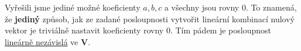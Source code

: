 \documentclass[12pt]{article}
\begin{document}
\begin{enumerate}
    Vyřešili jsme jediné možné koeficienty $a,b,c$ a všechny jsou rovny $0$. To znamená,
    že \textbf{jediný} způsob, jak ze zadané posloupnosti vytvořit lineární kombinací nulový vektor je triviálně nastavit koeficienty rovny $0$.
    Tím pádem je posloupnost \underline{lineárně nezávislá} ve \textbf{V}.
    

\end{enumerate}
\end{document}
